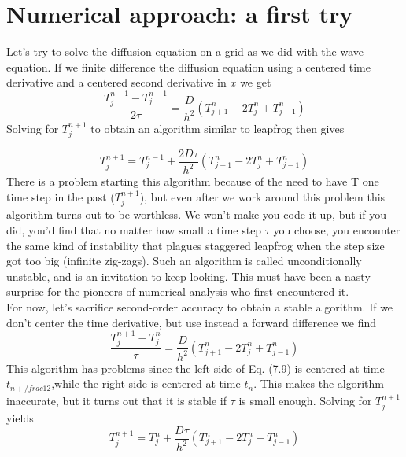 \documentclass{book}
\theoremstyle{plain}
\theoremstyle{definition}
\numberwithin{exm}{chapter}
\theoremstyle{remark}
\theoremstyle{summary}
\theoremstyle{overview}
\begin{document}
\section*{Numerical approach: a first try}

Let\rq s try to solve the diffusion equation on a grid as we did with the wave equation.
If we finite difference the diffusion equation using a centered time derivative and
a centered second derivative in $x$ we get
\begin{equation}\label{eq:77}
\frac{T_{j}^{n+1}-T_{j}^{n-1}}{2 \tau}=\frac{D}{h^{2}}\left(T_{j+1}^{n}-2 T_{j}^{n}+T_{j-1}^{n}\right)
\end{equation}
Solving for $T_j^{n+1}$ to obtain an algorithm similar to leapfrog then gives

\begin{equation}\label{eq:78}
T_{j}^{n+1}=T_{j}^{n-1}+\frac{2 D \tau}{h^{2}}\left(T_{j+1}^{n}-2 T_{j}^{n}+T_{j-1}^{n}\right)
\end{equation}
There is a problem starting this algorithm because of the need to have T one time
step in the past ($T_j^{n+1}$), but even after we work around this problem this algorithm
turns out to be worthless. We won\rq t make you code it up, but if you did, you\rq d
find that no matter how small a time step $\tau$ you choose, you encounter the same
kind of instability that plagues staggered leapfrog when the step size got too big
(infinite zig-zags). Such an algorithm is called unconditionally unstable, and is an
invitation to keep looking. This must have been a nasty surprise for the pioneers
of numerical analysis who first encountered it. \\ 
For now, let\rq s sacrifice second-order accuracy to obtain a stable algorithm. If
we don\rq t center the time derivative, but use instead a forward difference we find
\begin{equation}\label{eq:79}
\frac{T_{j}^{n+1}-T_{j}^{n}}{\tau}=\frac{D}{h^{2}}\left(T_{j+1}^{n}-2 T_{j}^{n}+T_{j-1}^{n}\right)
\end{equation}
This algorithm has problems since the left side of Eq. (7.9) is centered at time $t_{n+/frac{1}{2}}$,while the right side is centered at time $t_n$. This makes the algorithm inaccurate, but it turns out that it is stable if $\tau$ is small enough. Solving for $T_j^{n+1}$ yields
\begin{equation}\label{eq:710}
T_{j}^{n+1}=T_{j}^{n}+\frac{D \tau}{h^{2}}\left(T_{j+1}^{n}-2 T_{j}^{n}+T_{j-1}^{n}\right)
\end{equation}
\end{document}

